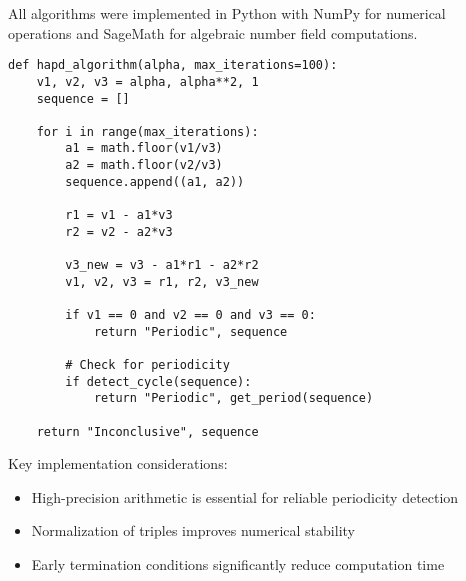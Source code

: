 All algorithms were implemented in Python with NumPy for numerical operations and SageMath for algebraic number field computations.

\begin{verbatim}
def hapd_algorithm(alpha, max_iterations=100):
    v1, v2, v3 = alpha, alpha**2, 1
    sequence = []

    for i in range(max_iterations):
        a1 = math.floor(v1/v3)
        a2 = math.floor(v2/v3)
        sequence.append((a1, a2))

        r1 = v1 - a1*v3
        r2 = v2 - a2*v3

        v3_new = v3 - a1*r1 - a2*r2
        v1, v2, v3 = r1, r2, v3_new

        if v1 == 0 and v2 == 0 and v3 == 0:
            return "Periodic", sequence

        # Check for periodicity
        if detect_cycle(sequence):
            return "Periodic", get_period(sequence)

    return "Inconclusive", sequence
\end{verbatim}

Key implementation considerations:
\begin{itemize}
    \item High-precision arithmetic is essential for reliable periodicity detection
    \item Normalization of triples improves numerical stability
    \item Early termination conditions significantly reduce computation time
\end{itemize}